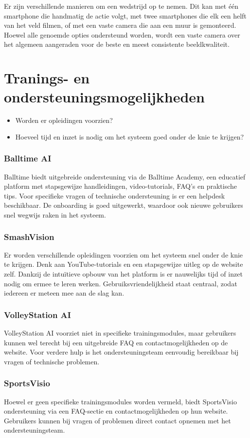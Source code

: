 Er zijn verschillende manieren om een wedstrijd op te nemen. Dit kan met één smartphone die handmatig de actie volgt, met twee smartphones die elk een helft van het veld filmen, of met een vaste camera die aan een muur is gemonteerd. Hoewel alle genoemde opties ondersteund worden, wordt een vaste camera over het algemeen aangeraden voor de beste en meest consistente beeldkwaliteit.\autocite{SportsVisio2025}

\section{Tranings- en ondersteuningsmogelijkheden}
\begin{itemize}
  \item Worden er opleidingen voorzien?
  \item Hoeveel tijd en inzet is nodig om het systeem goed onder de knie te krijgen?
\end{itemize}
\subsubsection{Balltime AI}
Balltime biedt uitgebreide ondersteuning via de Balltime Academy, een educatief platform met stapsgewijze handleidingen, video-tutorials, FAQ’s en praktische tips. Voor specifieke vragen of technische ondersteuning is er een helpdesk beschikbaar. De onboarding is goed uitgewerkt, waardoor ook nieuwe gebruikers snel wegwijs raken in het systeem. \autocite{BalltimeAI2025}
\subsubsection{SmashVision}
Er worden verschillende opleidingen voorzien om het systeem snel onder de knie te krijgen. Denk aan YouTube-tutorials en een stapsgewijze uitleg op de website zelf. Dankzij de intuïtieve opbouw van het platform is er nauwelijks tijd of inzet nodig om ermee te leren werken. Gebruiksvriendelijkheid staat centraal, zodat iedereen er meteen mee aan de slag kan. \autocite{Doren2025}
\subsubsection{VolleyStation AI}
VolleyStation AI voorziet niet in specifieke trainingsmodules, maar gebruikers kunnen wel terecht bij een uitgebreide FAQ en contactmogelijkheden op de website. Voor verdere hulp is het ondersteuningsteam eenvoudig bereikbaar bij vragen of technische problemen. \autocite{VolleyStationAI2025}
\subsubsection{SportsVisio}
Hoewel er geen specifieke trainingsmodules worden vermeld, biedt SportsVisio ondersteuning via een FAQ-sectie en contactmogelijkheden op hun website. Gebruikers kunnen bij vragen of problemen direct contact opnemen met het ondersteuningsteam.\autocite{SportsVisio2025}

